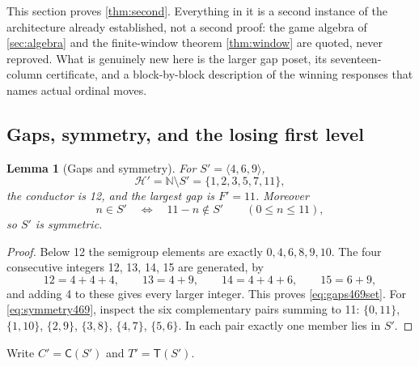 \documentclass[11pt,letterpaper]{article}
\numberwithin{equation}{section}
\newtheorem{lemma}[theorem]{Lemma}
\theoremstyle{definition}
\theoremstyle{remark}
\newcommand{\N}{\mathbb N}
\newcommand{\Ch}{\mathsf C}
\newcommand{\Norm}{\mathsf T}
\newcommand{\HH}{\mathcal H}
\begin{document}
This section proves \cref{thm:second}. Everything in it is a second
instance of the architecture already established, not a second proof: the
game algebra of \cref{sec:algebra} and the finite-window theorem
\cref{thm:window} are quoted, never reproved. What is genuinely new here
is the larger gap poset, its seventeen-column certificate, and a
block-by-block description of the winning responses that names actual
ordinal moves.

\subsection{Gaps, symmetry, and the losing first level}

\begin{lemma}[Gaps and symmetry]\label{lem:gaps469}
For $S'=\langle4,6,9\rangle$,
\begin{equation}\label{eq:gaps469set}
 \HH'=\N\setminus S'=\{1,2,3,5,7,11\},
\end{equation}
the conductor is 12, and the largest gap is $F'=11$. Moreover
\begin{equation}\label{eq:symmetry469}
 n\in S'\quad\Longleftrightarrow\quad 11-n\notin S'
 \qquad(0\leq n\leq11),
\end{equation}
so $S'$ is symmetric.
\end{lemma}
\begin{proof}
Below 12 the semigroup elements are exactly $0,4,6,8,9,10$. The four
consecutive integers 12, 13, 14, 15 are generated, by
\[
 12=4+4+4,\qquad 13=4+9,\qquad 14=4+4+6,\qquad 15=6+9,
\]
and adding 4 to these gives every larger integer. This proves
\cref{eq:gaps469set}. For \cref{eq:symmetry469}, inspect the six
complementary pairs summing to 11:
$\{0,11\}$, $\{1,10\}$, $\{2,9\}$, $\{3,8\}$, $\{4,7\}$, $\{5,6\}$.
In each pair exactly one member lies in $S'$.
\end{proof}

Write $C'=\Ch(S')$ and $T'=\Norm(S')$.
\end{document}
